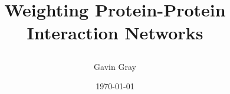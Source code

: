 \documentclass[12pt,oneside,abbrevs,dtc,mscres,neuro,notimes,logo]{styles/infthesis}
\title{\parbox{10cm}{Weighting Protein-Protein Interaction Networks}}
\author{Gavin Gray}
\date{\today}
\begin{document}



  \begin{preliminary}
    \maketitle

    
    \standarddeclaration
    \tableofcontents
    \listoffigures
  \end{preliminary}

  
  
  
  
  

  \appendix

  
  
  

  \printbibliography
\end{document}
